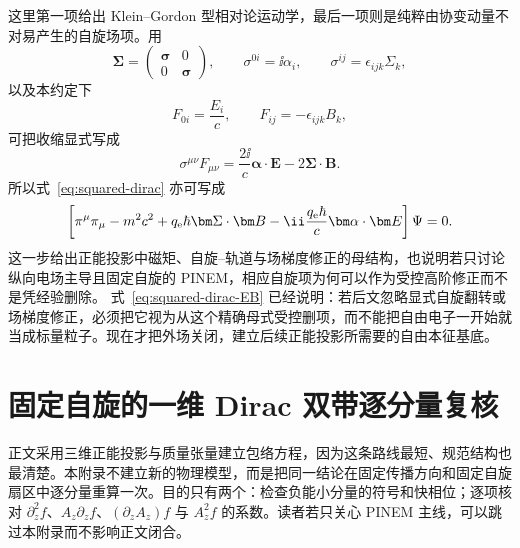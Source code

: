 这里第一项给出 Klein--Gordon 型相对论运动学，最后一项则是纯粹由协变动量不对易产生的自旋场项。用
\begin{equation}
 \bm\Sigma=
 \begin{pmatrix}
 \bm\sigma&0\\0&\bm\sigma
 \end{pmatrix},
 \qquad
 \sigma^{0i}=\ii\alpha_i,
 \qquad
 \sigma^{ij}=\epsilon_{ijk}\Sigma_k,
\end{equation}
以及本约定下
\begin{equation}
 F_{0i}=\frac{E_i}{c},
 \qquad
 F_{ij}=-\epsilon_{ijk}B_k,
\end{equation}
可把收缩显式写成
\begin{equation}
 \sigma^{\mu\nu}F_{\mu\nu}
 =\frac{2\ii}{c}\bm\alpha\cdot\bm E
 -2\bm\Sigma\cdot\bm B.
 \label{eq:sigmaF-EB}
\end{equation}
所以式~\eqref{eq:squared-dirac} 亦可写成
\begin{equation}
 \left[
 \pi^\mu\pi_\mu-m^2c^2
 +q_{\rm e}\hbar\bm\Sigma\cdot\bm B
 -\ii\frac{q_{\rm e}\hbar}{c}\bm\alpha\cdot\bm E
 \right]\Psi=0.
 \label{eq:squared-dirac-EB}
\end{equation}
这一步给出正能投影中磁矩、自旋--轨道与场梯度修正的母结构，也说明若只讨论纵向电场主导且固定自旋的 PINEM，相应自旋项为何可以作为受控高阶修正而不是凭经验删除。
式~\eqref{eq:squared-dirac-EB} 已经说明：若后文忽略显式自旋翻转或场梯度修正，必须把它视为从这个精确母式受控删项，而不能把自由电子一开始就当成标量粒子。现在才把外场关闭，建立后续正能投影所需要的自由本征基底。


\section{固定自旋的一维 Dirac 双带逐分量复核}
\label{app:dirac-two-band-check}

正文采用三维正能投影与质量张量建立包络方程，因为这条路线最短、规范结构也最清楚。本附录不建立新的物理模型，而是把同一结论在固定传播方向和固定自旋扇区中逐分量重算一次。目的只有两个：检查负能小分量的符号和快相位；逐项核对 $\partial_z^2f$、$A_z\partial_zf$、$(\partial_zA_z)f$ 与 $A_z^2f$ 的系数。读者若只关心 PINEM 主线，可以跳过本附录而不影响正文闭合。

